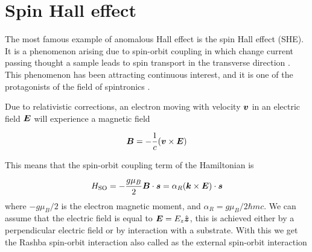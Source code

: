 \section{Spin Hall effect}
The most famous example of anomalous Hall effect is the spin Hall effect (SHE). It is a phenomenon arising due to spin-orbit coupling in which change current passing thought a sample leads to spin transport in the transverse direction \cite{d1971spin}. This phenomenon has been attracting continuous interest, and it is one of the protagonists of the field of spintronics \cite{wolf2001spintronics}.


Due to relativistic corrections, an electron moving with velocity $\boldsymbol{v}$ in an electric field $\boldsymbol{E}$ will experience a magnetic field 

\begin{equation}
    \boldsymbol{B}=-\frac 1c(\boldsymbol{v} \times \boldsymbol{E})
\end{equation}

This means that the spin-orbit coupling term of the Hamiltonian is 

\begin{equation}
    H_\textrm{SO}=-\frac{g\mu_B}{2}\boldsymbol{B}\cdot\boldsymbol{s}=
    \alpha_R(\boldsymbol{k} \times \boldsymbol{E})\cdot \boldsymbol{s}
    \label{eq:so-int}
\end{equation}
where $-g\mu_B/2$ is the electron magnetic moment, and $\alpha_R=g\mu_B/2\hbar mc$. We can assume that the electric field is equal to $\boldsymbol{E}= E_z \hat{\boldsymbol{z}}$, this is achieved  either by a perpendicular electric field or by interaction with a substrate. With this we get the Rashba spin-orbit interaction also called as the external spin-orbit interaction\cite{bychkov1984properties}

